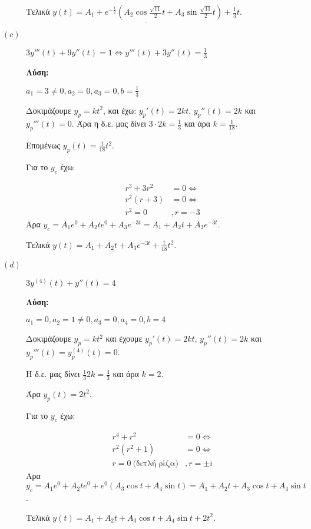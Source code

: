 \documentclass[a4paper,12pt]{article}
\begin{document}
\begin{description}
Τελικά $\underline{y(t) = A_1+e^{-\frac{1}{2}}(A_2\cos\frac{\sqrt{11}}{2}t+A_3\sin\frac{\sqrt{11}}{2}t)+\frac{1}{3}t}$.

\vspace{\baselineskip}

\item [$(c)$] $\boxed{
3y'''(t)+9y''(t) = 1  \Leftrightarrow
y'''(t)+3y''(t) = \frac{1}{3}
}$

\textbf{Λύση:}

\vspace{\baselineskip}

$a_1=3\neq 0, a_2=0, a_3=0, b=\frac{1}{3}$

Δοκιμάζουμε $y_p=kt^2$, και έχω: $y_p'(t)=2kt$, $y_p''(t)=2k$ και $y_p'''(t)=0$.
Άρα η δ.ε. μας δίνει $3\cdot 2k = \frac{1}{3}$ και άρα $k=\frac{1}{18}.$

Επομένως $y_p(t)=\frac{1}{18}t^2$.

Για το $y_c$ έχω:

\begin{align*}
r^3+3r^2&=0 \Leftrightarrow \\
r^2(r+3) &=0 \Leftrightarrow\\
r^2=0 &, r=-3
\end{align*}
Αρα $y_c = A_1e^0+A_2te^0+A_3e^{-3t}=A_1+A_2t+A_3e^{-3t}$.


Τελικά $\underline{y(t) = A_1+A_2t+A_3e^{-3t} +\frac{1}{18}t^2}$.

\vspace{\baselineskip}

\item [$(d)$] $\boxed{3y^{(4)}(t)+y''(t) = 4}$

\textbf{Λύση:}

\vspace{\baselineskip}

$a_1=0, a_2=1\neq 0, a_3=0, a_4=0, b=4$

Δοκιμάζουμε $y_p=kt^2$ και έχουμε $y_p'(t)=2kt$, $y_p''(t)=2k$ και $y_p'''(t)=y_p^{(4)}(t)=0$.

Η δ.ε. μας δίνει $\frac{1}{3}2k=\frac{4}{3}$ και άρα $k=2$.

Άρα $y_p(t)=2t^2$.

Για το $y_c$ έχω:

\begin{align*}
r^4+r^2&=0 \Leftrightarrow \\
r^2(r^2+1) &=0 \Leftrightarrow\\
r=0 \:\text{(διπλή ρίζα)} &, r=\pm i
\end{align*}
Αρα $y_c = A_1e^0+A_2te^0+e^{0}(A_3\cos t+A_4\sin t)=A_1+A_2t+A_3\cos t+A_4\sin t$.


Τελικά $\underline{y(t) =A_1+A_2t+A_3\cos t+A_4\sin t +2t^2}$.

\end{description}
\end{document}
